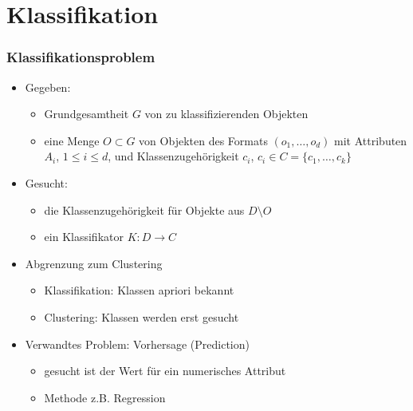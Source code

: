 \section{Klassifikation}




\begin{frame}
\frametitle{Klassifikationsproblem}

\begin{itemize}
\item Gegeben:
\begin{itemize}
\item Grundgesamtheit $G$ von zu klassifizierenden Objekten
\item eine Menge $O \subset G$ von Objekten des Formats $(o_1, \dots,
  o_d)$ mit Attributen $A_i$, $1 \leq i \leq d$, und
  Klassenzugehörigkeit $c_i$, $c_i \in C = \{c_1, \dots, c_k \}$
\end{itemize}
\item Gesucht:
\begin{itemize}
\item die Klassenzugehörigkeit für Objekte aus $D \setminus O$
\item ein Klassifikator $K: D \rightarrow C$
\end{itemize}
\item Abgrenzung zum Clustering
\begin{itemize}
\item Klassifikation: Klassen apriori bekannt
\item Clustering: Klassen werden erst gesucht
\end{itemize}
\item Verwandtes Problem: Vorhersage (Prediction)
\begin{itemize}
\item gesucht ist der Wert für ein numerisches Attribut
\item Methode z.B. Regression
\end{itemize}
\end{itemize}

\end{frame}


